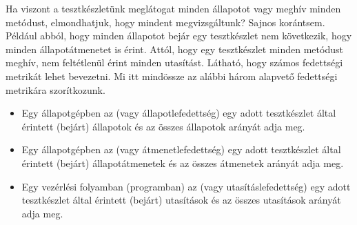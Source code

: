 Ha viszont a tesztkészletünk meglátogat minden állapotot vagy meghív minden metódust, elmondhatjuk, hogy mindent megvizsgáltunk? Sajnos korántsem. Például abból, hogy minden állapotot bejár egy tesztkészlet nem következik, hogy minden állapotátmenetet is érint. Attól, hogy egy tesztkészlet minden metódust meghív, nem feltétlenül érint minden utasítást. Látható, hogy számos fedettségi metrikát lehet bevezetni. Mi itt mindössze az alábbi három alapvető fedettségi metrikára szorítkozunk.
\begin{itemize}
	\item Egy állapotgépben az  (vagy állapotlefedettség) egy adott tesztkészlet által érintett (bejárt) állapotok és az összes állapotok arányát adja meg.
	\item Egy állapotgépben az  (vagy átmenetlefedettség) egy adott tesztkészlet által érintett (bejárt) állapotátmenetek és az összes átmenetek arányát adja meg.
	\item Egy vezérlési folyamban (programban) az  (vagy utasításlefedettség) egy adott tesztkészlet által érintett (bejárt) utasítások és az összes utasítások arányát adja meg.
\end{itemize}

